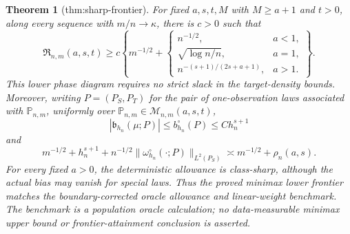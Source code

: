 \documentclass{article}
\newtheorem{theorem}{Theorem}
\begin{document}
\begin{theorem}[thm:sharp-frontier]\label{thm:sharp-frontier}
For fixed \(a,s,t,M\) with \(M\ge a+1\) and \(t>0\), along every sequence with \(m/n\to\kappa\), there is \(c>0\) such that
\[
\mathfrak R_{n,m}(a,s,t)\ge c\left\{m^{-1/2}+\begin{cases}
n^{-1/2},&a<1,\\
\sqrt{\log n/n},&a=1,\\
n^{-(s+1)/(2s+a+1)},&a>1.
\end{cases}\right\}.
\]
This lower phase diagram requires no strict slack in the target-density bounds. Moreover, writing \(P=(P_S,P_T)\) for the pair of one-observation laws associated with \(\mathbb P_{n,m}\), uniformly over \(\mathbb P_{n,m}\in\mathcal M_{n,m}(a,s,t)\),
\[
|\mathfrak b_{h_n}(\mu;P)|\le b_{h_n}^{\circ}(P)\le C h_n^{s+1}
\]
and
\[
m^{-1/2}+h_n^{s+1}
+n^{-1/2}\|\omega_{h_n}^{\circ}(\cdot;P)\|_{L^2(P_S)}
\asymp m^{-1/2}+\rho_n(a,s).
\]
For every fixed \(a>0\), the deterministic allowance is class-sharp, although the actual bias may vanish for special laws. Thus the proved minimax lower frontier matches the boundary-corrected oracle allowance and linear-weight benchmark. The benchmark is a population oracle calculation; no data-measurable minimax upper bound or frontier-attainment conclusion is asserted.
\end{theorem}
\end{document}
